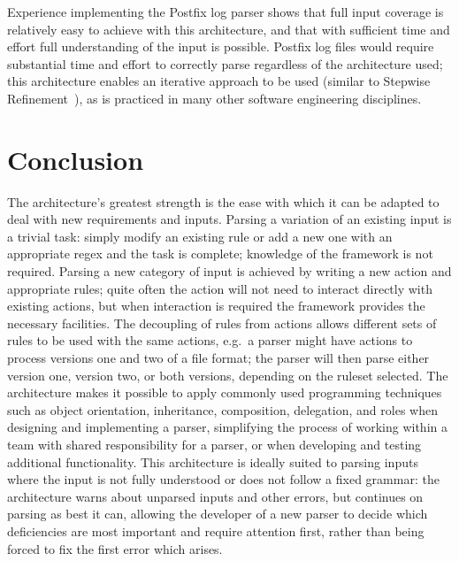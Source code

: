 \documentclass[draft]{svmult}
\begin{document}
Experience implementing the Postfix log parser shows that full input
coverage is relatively easy to achieve with this architecture, and that
with sufficient time and effort full understanding of the input is
possible.  Postfix log files would require substantial time and effort to
correctly parse regardless of the architecture used; this architecture
enables an iterative approach to be used (similar to Stepwise
Refinement~\cite{stepwise-refinement}), as is practiced in many other
software engineering disciplines.

\section{Conclusion}

The architecture's greatest strength is the ease with which it can be
adapted to deal with new requirements and inputs.  Parsing a variation of
an existing input is a trivial task: simply modify an existing rule or add
a new one with an appropriate regex and the task is complete; knowledge of
the framework is not required.  Parsing a new category
of input is achieved by writing a new action and appropriate rules; quite
often the action will not need to interact directly with existing actions,
but when interaction is required the framework provides the necessary
facilities.  The decoupling of rules from actions allows different sets of
rules to be used with the same actions, e.g.\ a parser might have actions
to process versions one and two of a file format; the parser will then
parse either version one, version two, or both versions, depending on the
ruleset selected.  The architecture makes it possible to apply commonly
used programming techniques such as object orientation, inheritance,
composition, delegation, and roles when designing and implementing a parser,
simplifying the process of working within a team with shared
responsibility for a parser, or when developing and testing additional functionality.
This architecture is ideally suited to parsing inputs where the input is
not fully understood or does not follow a fixed grammar: the architecture
warns about unparsed inputs and other errors, but continues on parsing as
best it can, allowing the developer of a new parser to decide which
deficiencies are most important and require attention first, rather than
being forced to fix the first error which arises.
\end{document}
